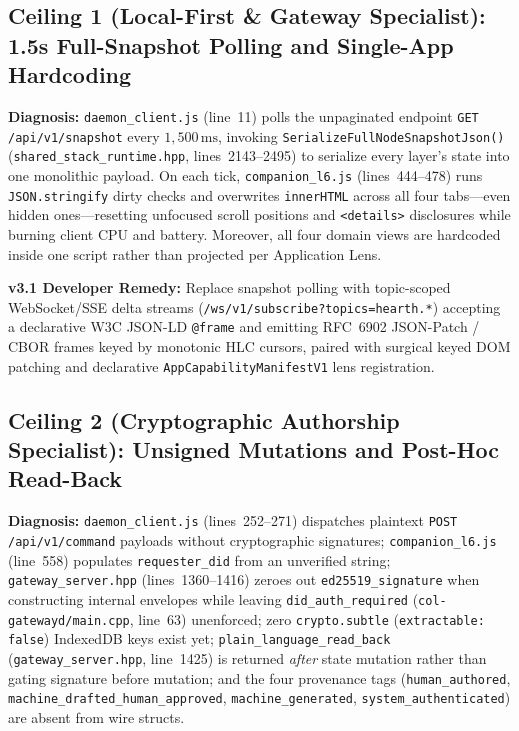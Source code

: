 \subsection{Ceiling 1 (Local-First \& Gateway Specialist): 1.5s Full-Snapshot Polling and Single-App Hardcoding}
\textbf{Diagnosis:} \texttt{daemon\_client.js} (line~11) polls the unpaginated endpoint \texttt{GET /api/v1/snapshot} every $1{,}500\,\mathrm{ms}$, invoking \texttt{SerializeFullNodeSnapshotJson()} (\texttt{shared\_stack\_runtime.hpp}, lines~2143--2495) to serialize every layer's state into one monolithic payload. On each tick, \texttt{companion\_l6.js} (lines~444--478) runs \texttt{JSON.stringify} dirty checks and overwrites \texttt{innerHTML} across all four tabs---even hidden ones---resetting unfocused scroll positions and \texttt{<details>} disclosures while burning client CPU and battery. Moreover, all four domain views are hardcoded inside one script rather than projected per Application Lens.

\textbf{v3.1 Developer Remedy:} Replace snapshot polling with topic-scoped WebSocket/SSE delta streams (\texttt{/ws/v1/subscribe?topics=hearth.*}) accepting a declarative W3C JSON-LD \texttt{@frame} and emitting RFC~6902 JSON-Patch / CBOR frames keyed by monotonic HLC cursors, paired with surgical keyed DOM patching and declarative \texttt{AppCapabilityManifestV1} lens registration.

\subsection{Ceiling 2 (Cryptographic Authorship Specialist): Unsigned Mutations and Post-Hoc Read-Back}
\textbf{Diagnosis:} \texttt{daemon\_client.js} (lines~252--271) dispatches plaintext \texttt{POST /api/v1/command} payloads without cryptographic signatures; \texttt{companion\_l6.js} (line~558) populates \texttt{requester\_did} from an unverified string; \texttt{gateway\_server.hpp} (lines~1360--1416) zeroes out \texttt{ed25519\_signature} when constructing internal envelopes while leaving \texttt{did\_auth\_required} (\texttt{col-gatewayd/main.cpp}, line~63) unenforced; zero \texttt{crypto.subtle} (\texttt{extractable: false}) IndexedDB keys exist yet; \texttt{plain\_language\_read\_back} (\texttt{gateway\_server.hpp}, line~1425) is returned \textit{after} state mutation rather than gating signature before mutation; and the four provenance tags (\texttt{human\_authored}, \texttt{machine\_drafted\_human\_approved}, \texttt{machine\_generated}, \texttt{system\_authenticated}) are absent from wire structs.

